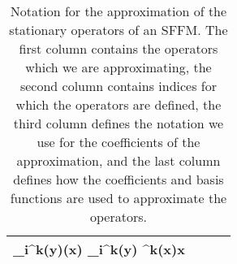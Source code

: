 \begin{table}[h!]
\begin{tabular}{c|c|c|c}
	 \bbpi_{i}^k(y)(\wrt x) %
	\approx\bs{\pi}_{i}^k(y) \bs \phi^k(x)\tr{}\wrt x
	\)\\\hline
 \end{tabular}
 \caption{Notation for the approximation of the stationary operators of an SFFM. The first column contains the operators which we are approximating, the second column contains indices for which the operators are defined, the third column defines the notation we use for the coefficients of the approximation, and the last column defines how the coefficients and basis functions are used to approximate the operators. \label{table:notations}}
 \end{table}

